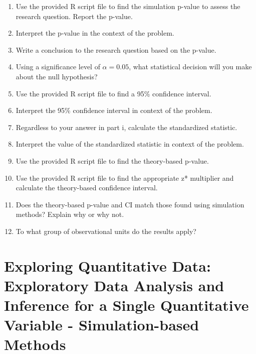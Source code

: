 \documentclass[
]{report}
\begin{document}
\begin{enumerate}
\def\labelenumi{\alph{enumi}.}
\setcounter{enumi}{9}
\item
  Use the provided R script file to find the simulation p-value to assess the research question. Report the p-value.
  \vspace{0.2in}
\item
  Interpret the p-value in the context of the problem.
  \vspace{0.8in}
\item
  Write a conclusion to the research question based on the p-value.
  \vspace{0.8in}
\item
  Using a significance level of \(\alpha = 0.05\), what statistical decision will you make about the null hypothesis?
  \vspace{0.3in}
\item
  Use the provided R script file to find a 95\% confidence interval.
  \vspace{0.4in}
\item
  Interpret the 95\% confidence interval in context of the problem.
  \vspace{0.8in}
\item
  Regardless to your answer in part i, calculate the standardized statistic.
  \vspace{0.8in}
\item
  Interpret the value of the standardized statistic in context of the problem.
  \vspace{0.8in}
\item
  Use the provided R script file to find the theory-based p-value.
  \vspace{0.3in}
\item
  Use the provided R script file to find the appropriate z* multiplier and calculate the theory-based confidence interval.
  \vspace{0.8in}
\item
  Does the theory-based p-value and CI match those found using simulation methods? Explain why or why not.
  \vspace{0.8in}
\item
  To what group of observational units do the results apply?
  \vspace{0.8in}
\end{enumerate}

\newpage

\newpage

\chapter{Exploring Quantitative Data: Exploratory Data Analysis and Inference for a Single Quantitative Variable - Simulation-based Methods}\label{exploring-quantitative-data-exploratory-data-analysis-and-inference-for-a-single-quantitative-variable---simulation-based-methods}
\end{document}
